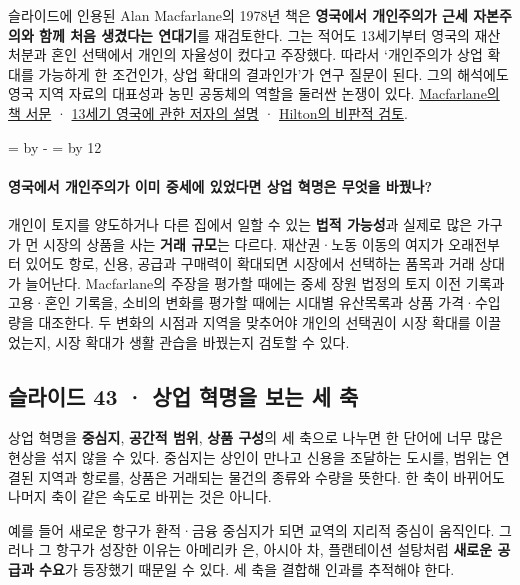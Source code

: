 \documentclass[10pt,a4paper]{article}
\newcommand{\ReserveQuestionSpace}{%
  \par\begingroup
  \dimen0=\pagegoal \advance\dimen0 by -\pagetotal
  \dimen2=\baselineskip \multiply\dimen2 by 12
  \ifdim\dimen0<\dimen2 \newpage\fi
  \endgroup}
\begin{document}
슬라이드에 인용된 Alan Macfarlane의 1978년 책은 \textbf{영국에서 개인주의가 근세 자본주의와 함께 처음 생겼다는 연대기}를 재검토한다. 그는 적어도 13세기부터 영국의 재산 처분과 혼인 선택에서 개인의 자율성이 컸다고 주장했다. 따라서 ‘개인주의가 상업 확대를 가능하게 한 조건인가, 상업 확대의 결과인가’가 연구 질문이 된다. 그의 해석에도 영국 지역 자료의 대표성과 농민 공동체의 역할을 둘러싼 논쟁이 있다. \href{https://www.alanmacfarlane.com/FILES/Origins\_preface.htm}{Macfarlane의 책 서문} · \href{https://www.alanmacfarlane.com/FILES/Reproduction\_Hawthorn.htm}{13세기 영국에 관한 저자의 설명} · \href{https://newleftreview.org/issues/i120/articles/rodney-hilton-individualism-and-the-english-peasantry.pdf}{Hilton의 비판적 검토}.\par

\ReserveQuestionSpace
\paragraph{영국에서 개인주의가 이미 중세에 있었다면 상업 혁명은 무엇을 바꿨나?}
개인이 토지를 양도하거나 다른 집에서 일할 수 있는 \textbf{법적 가능성}과 실제로 많은 가구가 먼 시장의 상품을 사는 \textbf{거래 규모}는 다르다. 재산권·노동 이동의 여지가 오래전부터 있어도 항로, 신용, 공급과 구매력이 확대되면 시장에서 선택하는 품목과 거래 상대가 늘어난다. Macfarlane의 주장을 평가할 때에는 중세 장원 법정의 토지 이전 기록과 고용·혼인 기록을, 소비의 변화를 평가할 때에는 시대별 유산목록과 상품 가격·수입량을 대조한다. 두 변화의 시점과 지역을 맞추어야 개인의 선택권이 시장 확대를 이끌었는지, 시장 확대가 생활 관습을 바꿨는지 검토할 수 있다.\par

\subsection{슬라이드 43 · 상업 혁명을 보는 세 축}
상업 혁명을 \textbf{중심지}, \textbf{공간적 범위}, \textbf{상품 구성}의 세 축으로 나누면 한 단어에 너무 많은 현상을 섞지 않을 수 있다. 중심지는 상인이 만나고 신용을 조달하는 도시를, 범위는 연결된 지역과 항로를, 상품은 거래되는 물건의 종류와 수량을 뜻한다. 한 축이 바뀌어도 나머지 축이 같은 속도로 바뀌는 것은 아니다.\par

예를 들어 새로운 항구가 환적·금융 중심지가 되면 교역의 지리적 중심이 움직인다. 그러나 그 항구가 성장한 이유는 아메리카 은, 아시아 차, 플랜테이션 설탕처럼 \textbf{새로운 공급과 수요}가 등장했기 때문일 수 있다. 세 축을 결합해 인과를 추적해야 한다.\par
\end{document}
